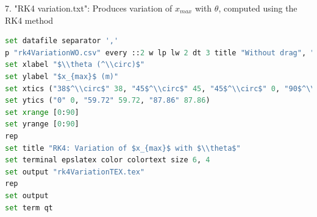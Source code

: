 \documentclass[12pt]{article}
\begin{document}
7. "RK4 variation.txt": Produces variation of $x_{max}$ with $\theta$, computed using the RK4 method
\begin{lstlisting}[language=Python, caption="RK2 variation.txt"]
set datafile separator ','
p "rk4VariationWO.csv" every ::2 w lp lw 2 dt 3 title "Without drag", "rk4VariationW.csv" every ::2 w lp lw 2 title "With drag"
set xlabel "$\\theta (^\\circ)$"
set ylabel "$x_{max}$ (m)"
set xtics ("38$^\\circ$" 38, "45$^\\circ$" 45, "45$^\\circ$" 0, "90$^\\circ$" 90, "0$^\\circ$" 0)
set ytics ("0" 0, "59.72" 59.72, "87.86" 87.86)
set xrange [0:90]
set yrange [0:90]
rep
set title "RK4: Variation of $x_{max}$ with $\\theta$"
set terminal epslatex color colortext size 6, 4
set output "rk4VariationTEX.tex"
rep
set output
set term qt 
\end{lstlisting}
\newpage 
\end{document}

